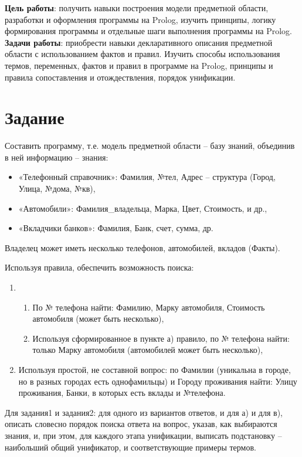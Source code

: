 \documentclass[a4paper,12pt]{article}
\begin{document}
	


\textbf{Цель работы}: получить навыки построения модели предметной области, разработки и оформления программы на Prolog, изучить принципы, логику формирования программы и отдельные шаги выполнения программы на Prolog.\\

\textbf{Задачи работы}: приобрести навыки декларативного описания предметной области с использованием фактов и правил.
Изучить способы использования термов, переменных, фактов и правил в программе на Prolog, принципы  и правила сопоставления и отождествления, порядок унификации.

\section*{Задание}

Составить программу, т.е. модель предметной области – базу знаний, объединив в ней информацию – знания:
\begin{itemize}
	\item «Телефонный справочник»: Фамилия, №тел, Адрес – структура (Город, Улица, №дома, №кв),
	\item «Автомобили»: Фамилия\_владельца, Марка, Цвет, Стоимость, и др.,
	\item «Вкладчики банков»: Фамилия, Банк, счет, сумма, др.
\end{itemize}

Владелец может иметь несколько телефонов, автомобилей, вкладов (Факты).

Используя правила, обеспечить возможность поиска:
\begin{enumerate}
	\item 
	\begin{enumerate}
		\item По № телефона найти: Фамилию, Марку автомобиля, Стоимость автомобиля (может быть несколько),
		\item Используя сформированное в пункте а) правило, по № телефона найти: только Марку автомобиля (автомобилей может быть несколько),
	\end{enumerate}
	\item Используя простой, не составной вопрос: по Фамилии (уникальна в городе, но в разных городах есть однофамильцы) и Городу проживания найти:  Улицу проживания, Банки, в которых есть вклады и №телефона.
\end{enumerate}

Для задания1 и задания2: 
для одного из вариантов ответов, и для а) и для в), описать словесно порядок поиска ответа на вопрос, указав, как выбираются знания, и, при этом, для каждого этапа унификации, выписать подстановку – наибольший общий унификатор, и соответствующие примеры термов.
\end{document}
